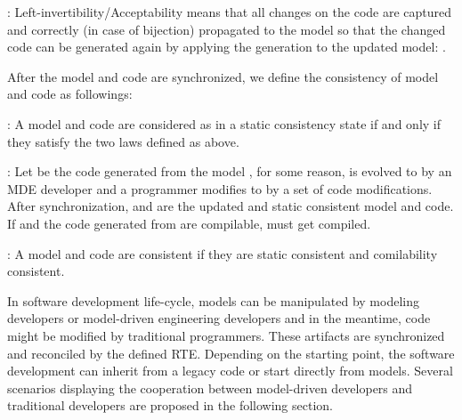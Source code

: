 \noindent
{}: Left-invertibility/Acceptability means that all changes on the code are captured and correctly (in case of bijection) propagated to the model so that the changed code can be generated again by applying the generation to the updated model: .

After the model and code are synchronized, we define the consistency of model and code as followings:

\noindent 
{}: A model and code are considered as in a static consistency state if and only if they satisfy the two laws defined as above.

\noindent
{}: Let  be the code generated from the model , for some reason,  is evolved to  by an MDE developer and a programmer modifies  to  by a set of code modifications. After synchronization,  and  are the updated and static consistent model and code. If  and the code  generated from  are compilable,  must get compiled.

\noindent
{}: A model and code are consistent if they are static consistent and comilability consistent.

In software development life-cycle, models can be manipulated by modeling developers or model-driven engineering developers and in the meantime, code might be modified by traditional programmers. These artifacts are synchronized and reconciled by the defined RTE. Depending on the starting point, the software development can inherit from a legacy code or start directly from models. Several scenarios displaying the cooperation between model-driven developers and traditional developers are proposed in the following section.  

